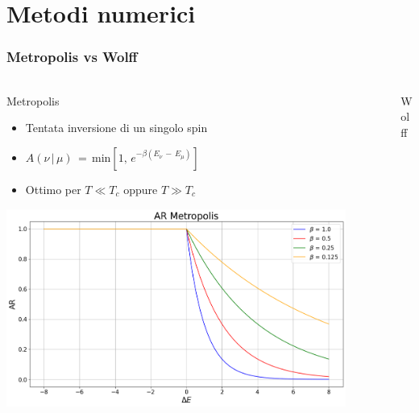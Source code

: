 \section{Metodi numerici}

\begin{frame}
    \frametitle{Metropolis vs Wolff}
    \framesubtitle{}

    \begin{columns}

        \begin{column}{0.5\textwidth}
            \begin{block}{Metropolis}

                \begin{itemize}[itemsep=0.5em, label=$\diamond$]
                    \item Tentata inversione di un singolo spin
                    \item $A\left(\nu\,|\,\mu\right)\,=\,\text{min}\left[1,\,e^{-\beta\left(E_{\nu}\,-\,E_{\mu}\right)}\right]$
                    \item Ottimo per $T \ll T_c$ oppure $T \gg T_c$
                \end{itemize}

                \centering
                \includegraphics[width=0.9\textwidth]{Immagini/metodiNumerici/accRate_metro.png}	
                
            \end{block}
        \end{column}


        \begin{column}{0.5\textwidth}
            \begin{block}{Wolff}


\end{block}
\end{column}
\end{columns}
\end{frame}

